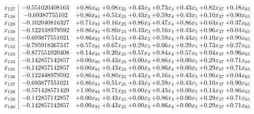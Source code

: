 \documentclass[8pt]{article}
\begin{document}
\[\begin{array}{c| c c@{\hskip 2pt} c@{\hskip 2pt} c@{\hskip 2pt} c@{\hskip 2pt} c@{\hskip 2pt} c@{\hskip 2pt} c@{\hskip 2pt} }
 x_{127}   &  -0.551020408163 & +  0.86 x_{81} & +  0.08 x_{25} & +  0.43 x_{3} & +  0.73 x_{4} & +  0.43 x_{5} & +  0.82 x_{37} & +  0.18 x_{65}\\
 x_{128}   &  -0.69387755102 & +  0.86 x_{81} & +  0.51 x_{25} & +  0.43 x_{3} & +  0.59 x_{4} & +  0.43 x_{5} & +  0.10 x_{37} & +  0.90 x_{65}\\
 x_{129}   &  -0.102040816327 & +  0.71 x_{81} & +  0.16 x_{25} & +  0.86 x_{3} & +  0.47 x_{4} & +  0.86 x_{5} & +  0.63 x_{37} & +  0.37 x_{65}\\
 x_{130}   &  -0.122448979592 & +  0.86 x_{81} & +  0.80 x_{25} & +  0.43 x_{3} & +  0.16 x_{4} & +  0.43 x_{5} & +  0.96 x_{37} & +  0.04 x_{65}\\
 x_{131}   &  -0.693877551021 & +  0.86 x_{81} & +  0.51 x_{25} & +  0.43 x_{3} & +  0.59 x_{4} & +  0.43 x_{5} & +  0.10 x_{37} & +  0.90 x_{65}\\
 x_{132}   &  -0.795918367347 & +  0.57 x_{81} & +  0.67 x_{25} & +  0.29 x_{3} & +  0.06 x_{4} & +  0.29 x_{5} & +  0.73 x_{37} & +  0.27 x_{65}\\
 x_{133}   &  -0.877551020408 & +  0.14 x_{81} & +  0.20 x_{25} & +  0.57 x_{3} & +  0.84 x_{4} & +  0.57 x_{5} & +  0.04 x_{37} & +  0.96 x_{65}\\
 x_{134}   &  -0.142857142857 & +  0.00 x_{81} & +  0.43 x_{25} & +  0.00 x_{3} & +  0.86 x_{4} & +  0.00 x_{5} & +  0.29 x_{37} & +  0.71 x_{65}\\
 x_{135}   &  -0.142857142857 & +  0.00 x_{81} & +  0.43 x_{25} & +  0.00 x_{3} & +  0.86 x_{4} & +  0.00 x_{5} & +  0.29 x_{37} & +  0.71 x_{65}\\
 x_{136}   &  -0.122448979592 & +  0.86 x_{81} & +  0.80 x_{25} & +  0.43 x_{3} & +  0.16 x_{4} & +  0.43 x_{5} & +  0.96 x_{37} & +  0.04 x_{65}\\
 x_{137}   &  -0.693877551021 & +  0.86 x_{81} & +  0.51 x_{25} & +  0.43 x_{3} & +  0.59 x_{4} & +  0.43 x_{5} & +  0.10 x_{37} & +  0.90 x_{65}\\
 x_{138}   &  -0.571428571429 & +  1.00 x_{81} & +  0.71 x_{25} & +  0.00 x_{3} & +  0.43 x_{4} & +  0.00 x_{5} & +  0.14 x_{37} & +  0.86 x_{65}\\
 x_{139}   &  -0.142857142857 & +  0.00 x_{81} & +  0.43 x_{25} & +  0.00 x_{3} & +  0.86 x_{4} & +  0.00 x_{5} & +  0.29 x_{37} & +  0.71 x_{65}\\
 x_{140}   &  -0.142857142857 & +  0.00 x_{81} & +  0.43 x_{25} & +  0.00 x_{3} & +  0.86 x_{4} & +  0.00 x_{5} & +  0.29 x_{37} & +  0.71 x_{65}\\

\end{array}\]
\end{document}
